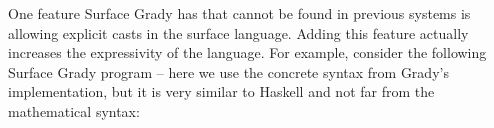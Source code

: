 One feature Surface Grady has that cannot be found in previous systems
is allowing explicit casts in the surface language.  Adding this
feature actually increases the expressivity of the language.  For
example, consider the following Surface Grady program -- here we use
the concrete syntax from Grady's implementation, but it is very
similar to Haskell and not far from the mathematical syntax:



